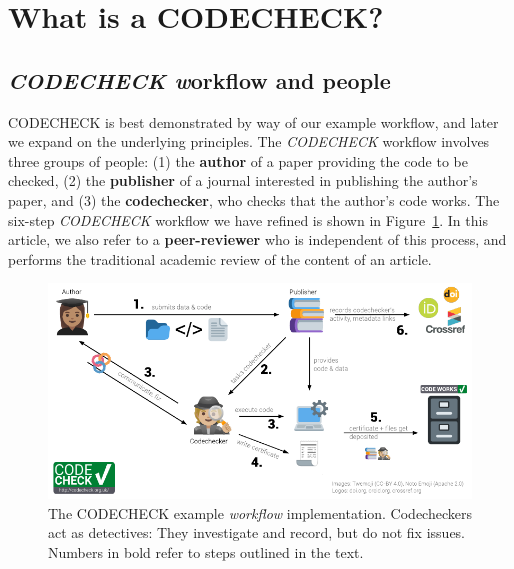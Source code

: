 \documentclass[12pt]{article}
\newcommand{\rev}[1]{\textit{#1}}
\begin{document}
\section*{What is a CODECHECK?}\label{what-is-a-codecheck}

\subsection*{\rev{CODECHECK w}orkflow and people}\label{workflow-people}

CODECHECK is best demonstrated by way of our example workflow, and later
we expand on the underlying principles. The \rev{CODECHECK} workflow involves three
groups of people:
(1) the \textbf{author} of a paper providing the code to be checked,
(2) the \textbf{publisher} of a journal interested in publishing the author's paper, and
(3) the \textbf{codechecker}, who checks that the author's code works.
The six-step \rev{CODECHECK} workflow we have refined is shown in
Figure~\ref{fig:workflow}.  In this article, we also refer to a
\textbf{peer-reviewer} who is independent of this process, and
performs the traditional academic review of the content of an article.

\begin{figure}
  \centering
      \includegraphics[width=\textwidth]{figs/codecheck_overview.pdf}
      \caption{The CODECHECK example \rev{workflow} implementation.
        Codecheckers act as detectives: They investigate and record,
        but do not fix issues.  Numbers in bold refer to steps
        outlined in the text.}
  \label{fig:workflow}
\end{figure}
\end{document}
